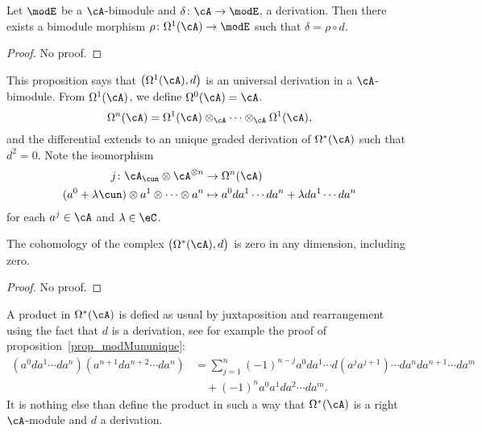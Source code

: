 \begin{proposition}
	Let $\modE$ be a $\cA$-bimodule and $\delta\colon \cA\to \modE$, a derivation. Then there exists a bimodule morphism $\rho\colon \Omega^1(\cA)\to \modE$ such that $\delta=\rho\circ d$.
\end{proposition}

\begin{proof}
	No proof.
\end{proof}

This proposition says that $\big( \Omega^1(\cA),d \big)$ is an universal derivation in a $\cA$-bimodule. From $\Omega^1(\cA)$, we define $\Omega^0(\cA)=\cA$.
\[
	\Omega^n(\cA)=\Omega^1(\cA)\otimes_{\cA}\cdots\otimes_{\cA}\Omega^1(\cA),
\]
and the differential extends to an unique graded derivation of $\Omega^*(\cA)$ such that $d^2=0$. Note the isomorphism
\begin{equation}
	\begin{aligned}
		j\colon \cA_{\cun}\otimes\cA^{\otimes n}               & \to\Omega^n(\cA)                                       \\
		(a^0+\lambda\cun)\otimes a^1\otimes\cdots\otimes a^{n} & \mapsto a^0da^1\cdots da^{n}+\lambda da^1\cdots da^{n}
	\end{aligned}
\end{equation}
for each $a^{j}\in\cA$ and $\lambda\in\eC$.

\begin{lemma}
	The cohomology of the complex $\big( \Omega^*(\cA),d \big)$ is zero in any dimension, including zero.
\end{lemma}
\begin{proof}
	No proof.
\end{proof}

A product in $\Omega^*(\cA)$ is defied as usual by juxtaposition and rearrangement using the fact that $d$ is a derivation, see for example the proof of proposition~\ref{prop_modMununique}:
\[
	\begin{split}
		(a^0da^1\cdots da^{n})(a^{n+1}da^{n+2}\cdots da^{n})&=\sum_{j=1}^{n}(-1)^{n-j}a^0da^1\cdots d(a^{j}a^{j+1})\cdots da^{n}da^{n+1}\cdots da^m\\
		&\quad+(-1)^na^0a^1 da^2\cdots da^{m}.
	\end{split}
\]
It is nothing else than define the product in such a way that $\Omega^*(\cA)$ is a right $\cA$-module and $d$ a derivation.


